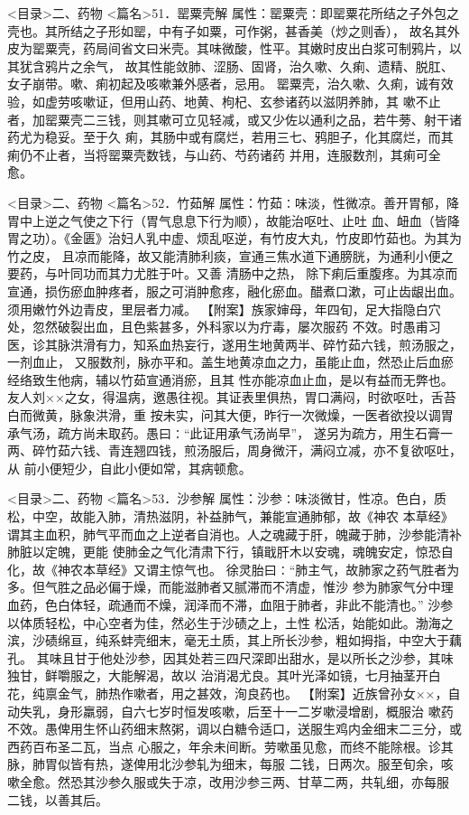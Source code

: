\documentclass[a4paper,12pt,UTF8,twoside]{ctexbook}
\begin{document}
<目录>二、药物
<篇名>51．罂粟壳解
属性：罂粟壳∶即罂粟花所结之子外包之壳也。其所结之子形如罂，中有子如粟，可作粥，甚香美（炒之则香）， 
故名其外皮为罂粟壳，药局间省文曰米壳。其味微酸，性平。其嫩时皮出白浆可制鸦片，以其犹含鸦片之余气， 
故其性能敛肺、涩肠、固肾，治久嗽、久痢、遗精、脱肛、女子崩带。嗽、痢初起及咳嗽兼外感者，忌用。 
罂粟壳，治久嗽、久痢，诚有效验，如虚劳咳嗽证，但用山药、地黄、枸杞、玄参诸药以滋阴养肺，其 
嗽不止者，加罂粟壳二三钱，则其嗽可立见轻减，或又少佐以通利之品，若牛蒡、射干诸药尤为稳妥。至于久 
痢，其肠中或有腐烂，若用三七、鸦胆子，化其腐烂，而其痢仍不止者，当将罂粟壳数钱，与山药、芍药诸药 
并用，连服数剂，其痢可全愈。 

<目录>二、药物
<篇名>52．竹茹解
属性：竹茹∶味淡，性微凉。善开胃郁，降胃中上逆之气使之下行（胃气息息下行为顺），故能治呕吐、止吐 
血、衄血（皆降胃之功）。《金匮》治妇人乳中虚、烦乱呕逆，有竹皮大丸，竹皮即竹茹也。为其为竹之皮， 
且凉而能降，故又能清肺利痰，宣通三焦水道下通膀胱，为通利小便之要药，与叶同功而其力尤胜于叶。又善 
清肠中之热， 
除下痢后重腹疼。为其凉而宣通，损伤瘀血肿疼者，服之可消肿愈疼，融化瘀血。醋煮口漱，可止齿龈出血。 
须用嫩竹外边青皮，里层者力减。 
【附案】族家婶母，年四旬，足大指隐白穴处，忽然破裂出血，且色紫甚多，外科家以为疔毒，屡次服药 
不效。时愚甫习医，诊其脉洪滑有力，知系血热妄行，遂用生地黄两半、碎竹茹六钱，煎汤服之，一剂血止， 
又服数剂，脉亦平和。盖生地黄凉血之力，虽能止血，然恐止后血瘀经络致生他病，辅以竹茹宣通消瘀，且其 
性亦能凉血止血，是以有益而无弊也。 
友人刘××之女，得温病，邀愚往视。其证表里俱热，胃口满闷，时欲呕吐，舌苔白而微黄，脉象洪滑，重 
按未实，问其大便，昨行一次微燥，一医者欲投以调胃承气汤，疏方尚未取药。愚曰∶“此证用承气汤尚早”， 
遂另为疏方，用生石膏一两、碎竹茹六钱、青连翘四钱，煎汤服后，周身微汗，满闷立减，亦不复欲呕吐，从 
前小便短少，自此小便如常，其病顿愈。 

<目录>二、药物
<篇名>53．沙参解
属性：沙参∶味淡微甘，性凉。色白，质松，中空，故能入肺，清热滋阴，补益肺气，兼能宣通肺郁，故《神农 
本草经》谓其主血积，肺气平而血之上逆者自消也。人之魂藏于肝，魄藏于肺，沙参能清补肺脏以定魄，更能 
使肺金之气化清肃下行，镇戢肝木以安魂，魂魄安定，惊恐自化，故《神农本草经》又谓主惊气也。 
徐灵胎曰∶“肺主气，故肺家之药气胜者为多。但气胜之品必偏于燥，而能滋肺者又腻滞而不清虚，惟沙 
参为肺家气分中理血药，色白体轻，疏通而不燥，润泽而不滞，血阻于肺者，非此不能清也。” 
沙参以体质轻松，中心空者为佳，然必生于沙碛之上，土性 
松活，始能如此。渤海之滨，沙碛绵亘，纯系蚌壳细末，毫无土质，其上所长沙参，粗如拇指，中空大于藕孔。 
其味且甘于他处沙参，因其处若三四尺深即出甜水，是以所长之沙参，其味独甘，鲜嚼服之，大能解渴，故以 
治消渴尤良。其叶光泽如镜，七月抽茎开白花，纯禀金气，肺热作嗽者，用之甚效，洵良药也。 
【附案】近族曾孙女××，自动失乳，身形羸弱，自六七岁时恒发咳嗽，后至十一二岁嗽浸增剧，概服治 
嗽药不效。愚俾用生怀山药细末熬粥，调以白糖令适口，送服生鸡内金细末二三分，或西药百布圣二瓦，当点 
心服之，年余未间断。劳嗽虽见愈，而终不能除根。诊其脉，肺胃似皆有热，遂俾用北沙参轧为细末，每服 
二钱，日两次。服至旬余，咳嗽全愈。然恐其沙参久服或失于凉，改用沙参三两、甘草二两，共轧细，亦每服 
二钱，以善其后。 
\end{document}

